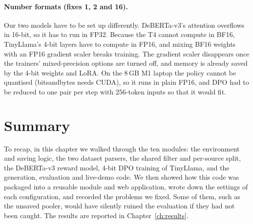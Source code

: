 \paragraph{Number formats (fixes 1, 2 and 16).} Our two models have to be set up differently. DeBERTa-v3's attention overflows in 16-bit, so it has to run in FP32. Because the T4 cannot compute in BF16, TinyLlama's 4-bit layers have to compute in FP16, and mixing BF16 weights with an FP16 gradient scaler breaks training. The gradient scaler disappears once the trainers' mixed-precision options are turned off, and memory is already saved by the 4-bit weights and LoRA. On the 8\,GB M1 laptop the policy cannot be quantised (bitsandbytes needs CUDA), so it runs in plain FP16, and DPO had to be reduced to one pair per step with 256-token inputs so that it would fit.

\section{Summary}
To recap, in this chapter we walked through the ten modules: the environment and saving logic, the two dataset parsers, the shared filter and per-source split, the DeBERTa-v3 reward model, 4-bit DPO training of TinyLlama, and the generation, evaluation and live-demo code. We then showed how this code was packaged into a reusable module and web application, wrote down the settings of each configuration, and recorded the problems we fixed. Some of them, such as the unsaved pooler, would have silently ruined the evaluation if they had not been caught. The results are reported in Chapter~\ref{ch:results}.
